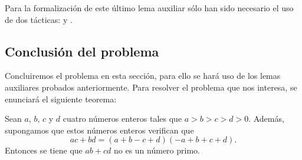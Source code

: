 Para la formalización de este último lema auxiliar sólo han sido
necesario el uso de dos tácticas:  y
.

\subsection{Conclusión del problema}

Concluiremos el problema en esta sección, para ello se hará uso de los
lemas auxiliares probados anteriormente. Para resolver el problema que
nos interesa, se enunciará el siguiente teorema:

\begin{teorema}[imo2001q6]
  Sean \(a\), \(b\), \(c\) y \(d\) cuatro números enteros tales que
  \(a > b > c > d > 0\). Además, supongamos que estos números enteros
  verifican que
    \begin{equation}\tag{h}\label{h01q6teor}
      ac+bd = (a+b-c+d)(-a+b+c+d).
    \end{equation}
    Entonces se tiene que \(ab+cd\) no es un número primo.
\end{teorema}

